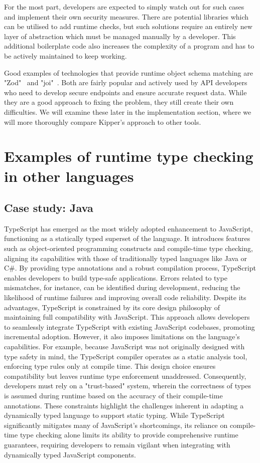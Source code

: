 For the most part, developers are expected to simply watch out for such cases and implement their own security measures. There are potential libraries which can be utilised to add runtime checks, but such solutions require an entirely new layer of abstraction which must be managed manually by a developer. This additional boilerplate code also increases the complexity of a program and has to be actively maintained to keep working.

Good examples of technologies that provide runtime object schema matching are "Zod"~\cite{zod} and "joi"~\cite{joi}. Both are fairly popular and actively used by API developers who need to develop secure endpoints and ensure accurate request data. While they are a good approach to fixing the problem, they still create their own difficulties. We will examine these later in the implementation section, where we will more thoroughly compare Kipper's approach to other tools.

\section{Examples of runtime type checking in other languages}

\subsection{Case study: Java}

TypeScript has emerged as the most widely adopted enhancement to JavaScript, functioning as a statically typed superset of the language. It introduces features such as object-oriented programming constructs and compile-time type checking, aligning its capabilities with those of traditionally typed languages like Java or C\#. By providing type annotations and a robust compilation process, TypeScript enables developers to build type-safe applications. Errors related to type mismatches, for instance, can be identified during development, reducing the likelihood of runtime failures and improving overall code reliability. Despite its advantages, TypeScript is constrained by its core design philosophy of maintaining full compatibility with JavaScript. This approach allows developers to seamlessly integrate TypeScript with existing JavaScript codebases, promoting incremental adoption. However, it also imposes limitations on the language’s capabilities. For example, because JavaScript was not originally designed with type safety in mind, the TypeScript compiler operates as a static analysis tool, enforcing type rules only at compile time. This design choice ensures compatibility but leaves runtime type enforcement unaddressed. Consequently, developers must rely on a "trust-based" system, wherein the correctness of types is assumed during runtime based on the accuracy of their compile-time annotations. These constraints highlight the challenges inherent in adapting a dynamically typed language to support static typing. While TypeScript significantly mitigates many of JavaScript’s shortcomings, its reliance on compile-time type checking alone limits its ability to provide comprehensive runtime guarantees, requiring developers to remain vigilant when integrating with dynamically typed JavaScript components.

